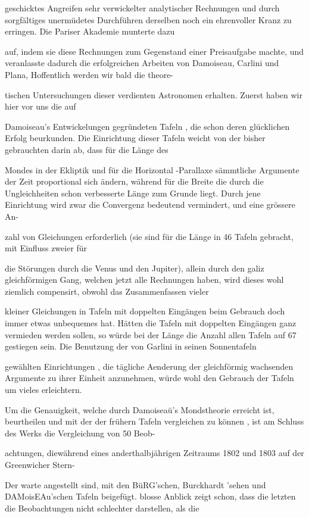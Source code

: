 \documentclass[10pt,a4paper]{article}
\begin{document}
geschicktes Angreifen sehr verwickelter analytischer Rechnungen und durch sorgfältiges unermüdetes Durchführen derselben noch ein ehrenvoller Kranz zu erringen. Die Pariser Akademie munterte dazu

auf, indem sie diese Rechnungen zum Gegenstand einer Preisaufgabe machte, und veranlasste dadurch die erfolgreichen Arbeiten von Damoiseau, Carlini und Plana, Hoffentlich werden wir bald die theore-

tischen Untersuchungen dieser verdienten Astronomen erhalten. Zuerst haben wir hier vor uns die auf

Damoiseau's Entwickelungen gegründeten Tafeln , die schon deren glücklichen Erfolg beurkunden. Die Einrichtung dieser Tafeln weicht von der bisher gebrauchten darin ab, dass für die Länge des

Mondes in der Ekliptik und für die Horizontal -Parallaxe sämmtliche Argumente der Zeit proportional sich ändern, während für die Breite die durch die Ungleichheiten schon verbesserte Länge zum Grunde liegt. Durch jene Einrichtung wird zwar die Convergenz bedeutend vermindert, und eine grössere An-

zahl von Gleichungen erforderlich (sie sind für die Länge in 46 Tafeln gebracht, mit Einfluss zweier für

die Störungen durch die Venus und den Jupiter), allein durch den galiz gleichförmigen Gang, welchen jetzt alle Rechnungen haben, wird dieses wohl ziemlich compensirt, obwohl das Zusammenfassen vieler

kleiner Gleichungen in Tafeln mit doppelten Eingängen beim Gebrauch doch immer etwas unbequemes hat. Hätten die Tafeln mit doppelten Eingängen ganz vermieden werden sollen, so würde bei der Länge die Anzahl allen Tafeln auf 67 gestiegen sein. Die Benutzung der von Garlini in seinen Sonnentafeln

gewählten Einrichtungen , die tägliche Aenderung der gleichförmig wachsenden Argumente zu ihrer Einheit anzunehmen, würde wohl den Gebrauch der Tafeln um vieles erleichtern.

Um die Genauigkeit, welche durch Damoiseaü's Mondstheorie erreicht ist, beurtheilen und mit der der frühern Tafeln vergleichen zu können , ist am Schluss des Werks die Vergleichung von 50 Beob-

achtungen, diewährend eines anderthalbjährigen Zeitraums 1802 und 1803 auf der Greenwicher Stern-

Der warte angestellt sind, mit den BüRG'schen, Burckhardt 'sehen und DAMoisEAu'schen Tafeln beigefügt. blosse Anblick zeigt schon, dass die letzten die Beobachtungen nicht schlechter darstellen, als die
\end{document}
